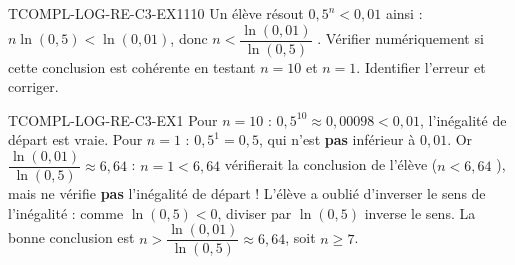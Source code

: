 

\begin{exercice}{TCOMPL-LOG-RE-C3-EX1}{1}{10}
Un élève résout $0{,}5^n < 0{,}01$ ainsi : \og $n\ln(0{,}5) < \ln(0{,}01)$, donc $n < \dfrac{\ln(0{,}01)}{\ln(0{,}5)}$ \fg{}. Vérifier numériquement si cette conclusion est cohérente en testant $n=10$ et $n=1$. Identifier l'erreur et corriger.
\end{exercice}


\begin{corrige}{TCOMPL-LOG-RE-C3-EX1}
Pour $n=10$ : $0{,}5^{10} \approx 0{,}00098 < 0{,}01$, l'inégalité de départ est vraie. Pour $n=1$ : $0{,}5^1=0{,}5$, qui n'est \textbf{pas} inférieur à $0{,}01$. Or $\dfrac{\ln(0{,}01)}{\ln(0{,}5)} \approx 6{,}64$ : $n=1 < 6{,}64$ vérifierait la conclusion de l'élève (\og $n < 6{,}64$ \fg{}), mais ne vérifie \textbf{pas} l'inégalité de départ ! L'élève a oublié d'inverser le sens de l'inégalité : comme $\ln(0{,}5)<0$, diviser par $\ln(0{,}5)$ inverse le sens. La bonne conclusion est $n > \dfrac{\ln(0{,}01)}{\ln(0{,}5)} \approx 6{,}64$, soit $n\geq7$.
\end{corrige}
